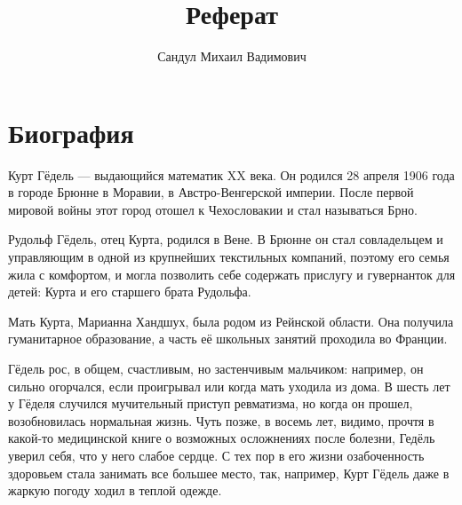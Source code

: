 \documentclass[specialist,
               substylefile = spbu.rtx,
               subf,href,colorlinks=true, 12pt]{disser}
\begin{document}

\title{
Реферат}


\author{ Сандул Михаил Вадимович }


\date{\number\year}

\maketitle

\chapter{Биография\cite{ias}\cite{st-andr}\cite{kreisel}\cite{stanford}}

Курт Гёдель --- выдающийся математик XX века. Он родился 28 апреля 1906 года в городе Брюнне в Моравии, в Австро-Венгерской империи. После первой мировой войны этот город отошел к Чехословакии и стал называться Брно.\par

Рудольф Гёдель, отец Курта, родился в Вене. В Брюнне он стал совладельцем и управляющим в одной из крупнейших текстильных компаний, поэтому его семья жила с комфортом, и могла позволить себе содержать прислугу и гувернанток для детей: Курта и его старшего брата Рудольфа.\par

Мать Курта, Марианна Хандшух, была родом из Рейнской области. Она получила гуманитарное образование, а часть её школьных занятий проходила во Франции.\par

Гёдель рос, в общем, счастливым, но застенчивым мальчиком: например, он сильно огорчался, если проигрывал или когда мать уходила из дома. В шесть лет у Гёделя случился мучительный приступ ревматизма, но когда он прошел, возобновилась нормальная жизнь. Чуть позже, в восемь лет, видимо, прочтя в какой-то медицинской книге о возможных осложнениях после болезни, Гедёль уверил себя, что у него слабое сердце. С тех пор в его жизни озабоченность здоровьем стала занимать все большее место, так, например, Курт Гёдель даже в жаркую погоду ходил в теплой одежде.\par
\end{document}
